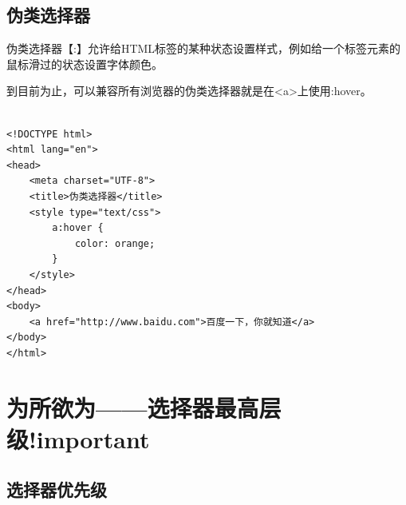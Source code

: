 \subsection{伪类选择器}

伪类选择器【:】允许给HTML标签的某种状态设置样式，例如给一个标签元素的鼠标滑过的状态设置字体颜色。

\begin{table}[H]
	\centering
	\caption{常用伪类选择器}
\end{table}

到目前为止，可以兼容所有浏览器的伪类选择器就是在<a>上使用:hover。 \\

 \\

\begin{lstlisting}[style=htmlcssjs]
<!DOCTYPE html>
<html lang="en">
<head>
    <meta charset="UTF-8">
    <title>伪类选择器</title>
    <style type="text/css">
        a:hover {
            color: orange;
        }
    </style>
</head>
<body>
    <a href="http://www.baidu.com">百度一下，你就知道</a>
</body>
</html>
\end{lstlisting}

\newpage

\section{为所欲为——选择器最高层级!important}

\subsection{选择器优先级}

